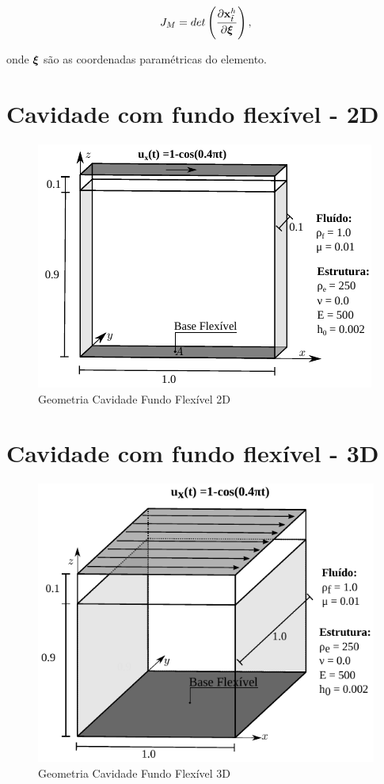 \documentclass[tese_patricia]{subfiles}
\begin{document}
\begin{align}
	J_M = det\left(\frac{\partial\mathbf{x}^h_{\tilde{t}}}{\partial\boldsymbol{\xi}}\right), 
	\label{eq:3}
\end{align}

\noindent onde $\boldsymbol{\xi}$ são as coordenadas paramétricas do elemento.


\section{Cavidade com fundo flexível - 2D}

\begin{figure}[htb!]
	\centering 
	\includegraphics[scale=1.3,trim=0cm 0cm 0cm 0cm, clip=true]{Imagens/Cap5/cav2d.pdf}	
	\caption{Geometria Cavidade Fundo Flexível 2D}
	\label{fig:cavidadeFF2d}
\end{figure}
\section{Cavidade com fundo flexível - 3D}

\begin{figure}[htb!]
	\centering 
	\includegraphics[scale=0.9,trim=0cm 0cm 0cm 0cm, clip=true]{Imagens/Cap5/cav3d.pdf}	
	\caption{Geometria Cavidade Fundo Flexível 3D}
	\label{fig:cavidadeFF3d}
\end{figure}
\end{document}
